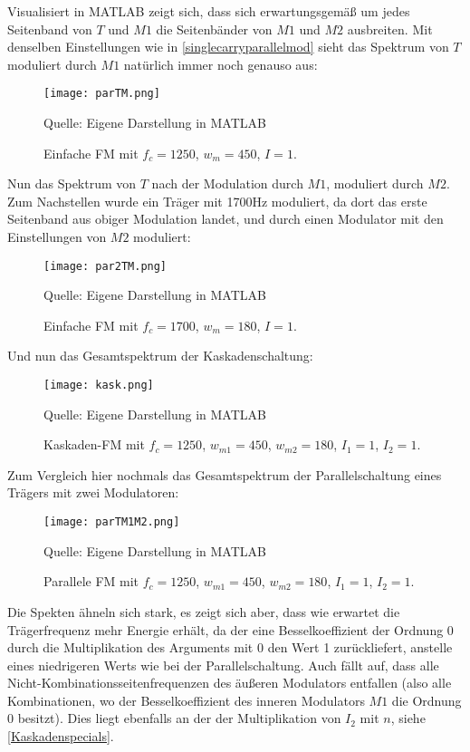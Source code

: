 Visualisiert in MATLAB zeigt sich, dass sich erwartungsgemäß um jedes Seitenband von $T$ und $M1$ die Seitenbänder von $M1$ und $M2$ ausbreiten. Mit denselben Einstellungen wie in \ref{singlecarryparallelmod} sieht das Spektrum von $T$ moduliert durch $M1$ natürlich immer noch genauso aus:
\FloatBarrier
\begin{figure} [ht]
\centering
  \texttt{[image: parTM.png]}
\caption{Einfache FM mit $f_c = 1250$, $w_m = 450$, $I = 1$. }
Quelle: Eigene Darstellung in MATLAB
\end{figure}
\FloatBarrier
Nun das Spektrum von $T$ nach der Modulation durch $M1$, moduliert durch $M2$. Zum Nachstellen wurde ein Träger mit 1700Hz moduliert, da dort das erste Seitenband aus obiger Modulation landet, und durch einen Modulator mit den Einstellungen von $M2$ moduliert:
\FloatBarrier
\begin{figure} [ht]
\centering
  \texttt{[image: par2TM.png]}
\caption{Einfache FM mit $f_c = 1700$, $w_m = 180$, $I = 1$. }
Quelle: Eigene Darstellung in MATLAB
\end{figure}
\FloatBarrier
Und nun das Gesamtspektrum der Kaskadenschaltung:
\FloatBarrier
\begin{figure} [ht]
\centering
  \texttt{[image: kask.png]}
\caption{Kaskaden-FM mit $f_c = 1250$, $w_{m1} = 450$, $w_{m2} = 180$, $I_1 = 1$, $I_2 = 1$. }
Quelle: Eigene Darstellung in MATLAB
\end{figure}
\FloatBarrier
Zum Vergleich hier nochmals das Gesamtspektrum der Parallelschaltung eines Trägers mit zwei Modulatoren:
\FloatBarrier
\begin{figure} [ht]
\centering
  \texttt{[image: parTM1M2.png]}
\caption{Parallele FM mit $f_c = 1250$, $w_{m1} = 450$, $w_{m2} = 180$, $I_1 = 1$, $I_2 = 1$. }
Quelle: Eigene Darstellung in MATLAB
\end{figure}
\FloatBarrier
Die Spekten ähneln sich stark, es zeigt sich aber, dass wie erwartet die Trägerfrequenz mehr Energie erhält, da der eine Besselkoeffizient der Ordnung $0$ durch die Multiplikation des Arguments mit $0$ den Wert 1 zurückliefert, anstelle eines niedrigeren Werts wie bei der Parallelschaltung. Auch fällt auf, dass alle Nicht-Kombinationsseitenfrequenzen des äußeren Modulators entfallen (also alle Kombinationen, wo der Besselkoeffizient des inneren Modulators $M1$ die Ordnung $0$ besitzt). Dies liegt ebenfalls an der der Multiplikation von $I_2$ mit $n$, siehe \ref{Kaskadenspecials}. 

